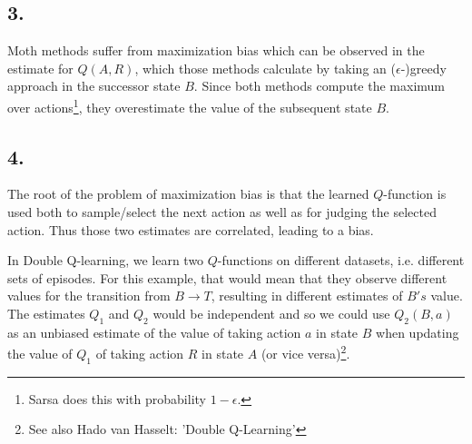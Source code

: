 \documentclass{article}
\begin{document}
\subsection*{3.}
Moth methods suffer from maximization bias which can be observed in the estimate for $Q(A,R)$, which those methods calculate by taking an ($\epsilon$-)greedy approach in the successor state $B$. Since both methods compute the maximum over actions\footnote{Sarsa does this with probability $1-\epsilon$.}, they overestimate the value of the subsequent state $B$.


\subsection*{4.}
The root of the problem of maximization bias is that the learned $Q$-function is used both to sample/select the next action as well as for judging the selected action. Thus those two estimates are correlated, leading to a bias. 

In Double Q-learning, we learn two $Q$-functions on different datasets, i.e. different sets of episodes. For this example, that would mean that they observe different values for the transition from $B\to T$, resulting in different estimates of $B's$ value. The estimates $Q_1$ and $Q_2$ would be independent and so we could use $Q_2(B, a)$ as an unbiased estimate of the value of taking action $a$ in state $B$ when updating the value of $Q_1$ of taking action $R$ in state $A$ (or vice versa)\footnote{See also {Hado van Hasselt: 'Double Q-Learning'}}.

 
\end{document}
